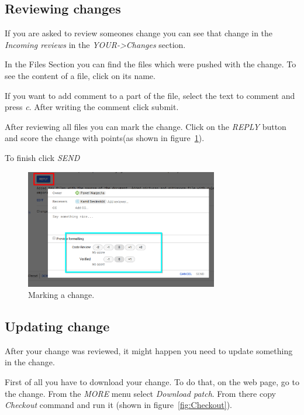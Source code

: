\documentclass{article}
\begin{document}
\subsection{Reviewing changes}

If you are asked to review someones change you can see that change in the \textit{Incoming reviews} in the \textit{YOUR->Changes} section.

In the Files Section you can find the files which were pushed with the change. To see the content of a file, click on its name.

If you want to add comment to a part of the file, select the text to comment and press \textit{c}. After writing the comment click submit.

After reviewing all files you can mark the change. Click on the \textit{REPLY} button and score the change with points(as shown in figure~\ref{fig:Marking}).

To finish click \textit{SEND}

\begin{figure}[!ht]
  \centering
  \includegraphics[width=0.75\textwidth]{img/Marking}
  \caption{Marking a change.}
  \label{fig:Marking}
\end{figure}

\newpage

\subsection{Updating change}

After your change was reviewed, it might happen you need to update something in the change. 

First of all you have to download your change. To do that, on the web page, go to the change. From the \textit{MORE} menu select \textit{Download patch}. From there copy \textit{Checkout} command and run it (shown in figure~\ref{fig:Checkout}).
\end{document}
